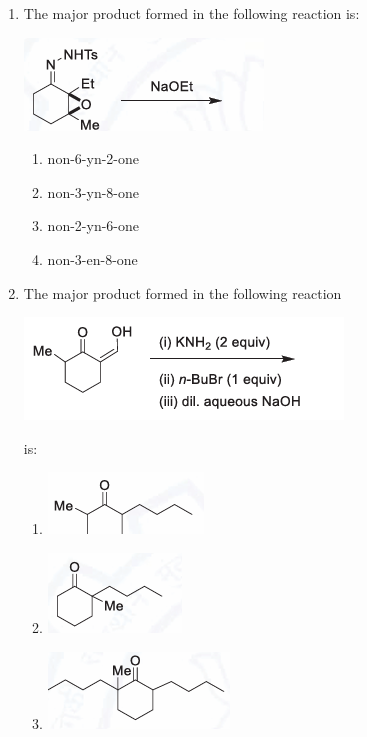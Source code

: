 \documentclass[journal,12pt,onecolumn]{IEEEtran}
\begin{document}
\begin{enumerate}
    \item The major product formed in the following reaction is:
    \begin{center}
    \includegraphics[width=0.4\columnwidth]{figs/q40.png}
    \end{center}
    \begin{multicols}{2}
    \begin{enumerate}
        \item non-6-yn-2-one
        \item non-3-yn-8-one
        \item non-2-yn-6-one
        \item non-3-en-8-one
    \end{enumerate}
    \end{multicols}
    \hfill{}
 \item The major product formed in the following reaction 
    \begin{center}
    \includegraphics[width=0.4\columnwidth]{figs/q41.png}
    \end{center}
    is:
    \begin{multicols}{2}
    \begin{enumerate}
        \item \includegraphics[width=0.4\columnwidth]{figs/q41a.png}
        \item \includegraphics[width=0.4\columnwidth]{figs/q41b.png}
        \item \includegraphics[width=0.4\columnwidth]{figs/q41c.png}

\end{enumerate}
\end{multicols}
\end{enumerate}
\end{document}
